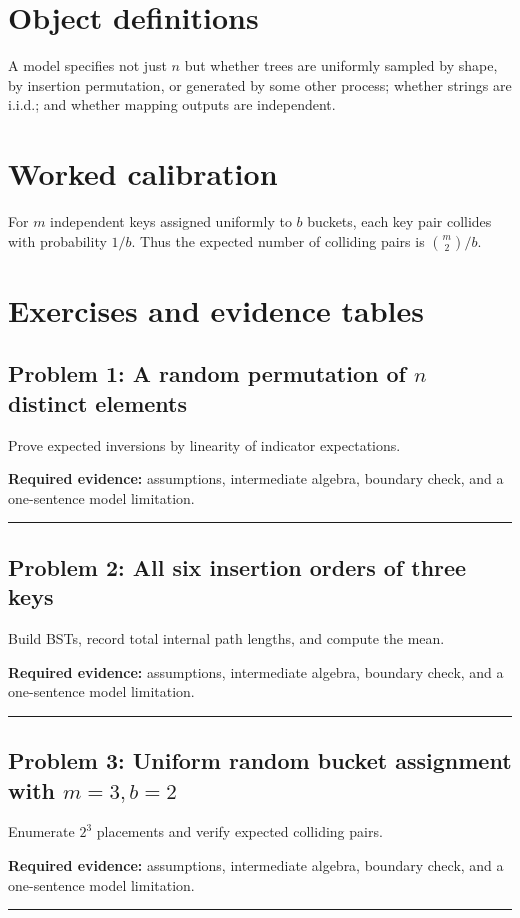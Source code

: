 \documentclass[11pt]{article}
\begin{document}
\makedoctocpage
\section{Object definitions}
A model specifies not just $n$ but whether trees are uniformly sampled by shape, by insertion permutation, or generated by some other process; whether strings are i.i.d.; and whether mapping outputs are independent.
\section{Worked calibration}
For $m$ independent keys assigned uniformly to $b$ buckets, each key pair collides with probability $1/b$. Thus the expected number of colliding pairs is $\binom{m}{2}/b$.

\section{Exercises and evidence tables}
\subsection{\texorpdfstring{Problem 1: A random permutation of $n$ distinct elements}{Problem 1: A random permutation of n distinct elements}}
Prove expected inversions by linearity of indicator expectations.\par
\textbf{Required evidence:} assumptions, intermediate algebra, boundary check, and a one-sentence model limitation.\par
\vspace{1.2cm}\hrule\vspace{0.4cm}
\subsection{Problem 2: All six insertion orders of three keys}
Build BSTs, record total internal path lengths, and compute the mean.\par
\textbf{Required evidence:} assumptions, intermediate algebra, boundary check, and a one-sentence model limitation.\par
\vspace{1.2cm}\hrule\vspace{0.4cm}
\subsection{\texorpdfstring{Problem 3: Uniform random bucket assignment with $m=3,b=2$}{Problem 3: Uniform bucket assignment with m=3 and b=2}}
Enumerate $2^3$ placements and verify expected colliding pairs.\par
\textbf{Required evidence:} assumptions, intermediate algebra, boundary check, and a one-sentence model limitation.\par
\vspace{1.2cm}\hrule\vspace{0.4cm}
\end{document}
